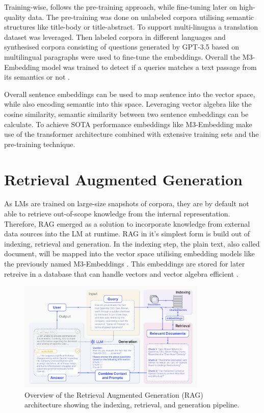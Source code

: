 \documentclass[a4paper,oneside,bibliography=totoc]{scrbook}
\begin{document}
Training-wise, \citet{Chen2024} follows the pre-training approach, while fine-tuning later on high-quality data. The pre-training was done on unlabeled corpora utilising semantic structures like title-body or title-abstract. To support multi-linugua a translation dataset was leveraged. Then labeled corpora in different languages and synthesised corpora consisting of questions generated by \ac{GPT}-3.5 based on multilingual paragraphs were used to fine-tune the embeddings. Overall the M3-Embedding model was trained to detect if a queries matches a text passage from its semantics or not \cite{Chen2024}.

Overall sentence embeddings can be used to map sentence into the vector space, while also encoding semantic into this space. Leveraging vector algebra like the cosine similarity, semantic similarity between two sentence embeddings can be calculate. To achieve SOTA performance embeddings like M3-Embedding make use of the transformer architecture combined with extensive training sets and the pre-training technique.

\section{Retrieval Augmented Generation}
\label{sec:retrieval_augmented_generation}

As \acp{LM} are trained on large-size snapshots of corpora, they are by default not able to retrieve out-of-scope knowledge from the internal representation. Therefore, \ac{RAG} emerged as a solution to incorporate knowledge from external data sources into the \ac{LM} at runtime. \ac{RAG} in it's simplest form is build out of indexing, retrieval and generation. In the indexing step, the plain text, also called document, will be mapped into the vector space utilising embedding models like the previously named M3-Embeddings \cite{Gao2024}. This embeddings are stored for later retreive in a database that can handle vectors and vector algebra efficient \cite{Gao2024,Pan2024}.

\begin{figure}[t]
  \centering
  \includegraphics[width=0.8\textwidth]{figures/RAG.png}
  \caption{Overview of the Retrieval Augmented Generation (RAG) architecture showing the indexing, retrieval, and generation pipeline. \cite{Gao2024}}
  \label{fig:rag}
\end{figure}
\end{document}
